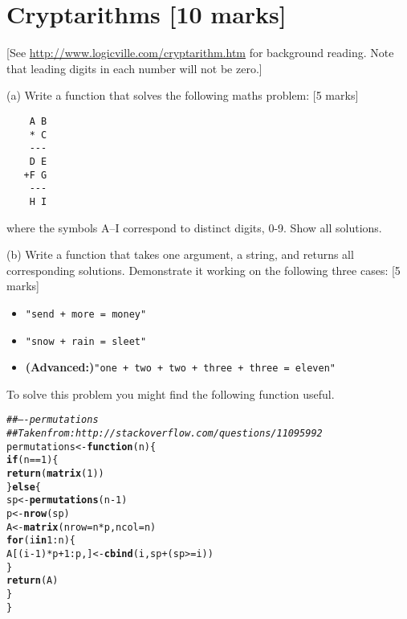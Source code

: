 \documentclass[11pt]{article}\usepackage[]{graphicx}\usepackage[]{color}
\makeatletter
\newcommand{\hlnum}[1]{\textcolor[rgb]{0.686,0.059,0.569}{#1}}%
\newcommand{\hlcom}[1]{\textcolor[rgb]{0.678,0.584,0.686}{\textit{#1}}}%
\newcommand{\hlopt}[1]{\textcolor[rgb]{0,0,0}{#1}}%
\newcommand{\hlstd}[1]{\textcolor[rgb]{0.345,0.345,0.345}{#1}}%
\newcommand{\hlkwa}[1]{\textcolor[rgb]{0.161,0.373,0.58}{\textbf{#1}}}%
\newcommand{\hlkwb}[1]{\textcolor[rgb]{0.69,0.353,0.396}{#1}}%
\newcommand{\hlkwc}[1]{\textcolor[rgb]{0.333,0.667,0.333}{#1}}%
\newcommand{\hlkwd}[1]{\textcolor[rgb]{0.737,0.353,0.396}{\textbf{#1}}}%
\newenvironment{kframe}{%
 \def\at@end@of@kframe{}%
 \ifinner\ifhmode%
  \def\at@end@of@kframe{\end{minipage}}%
  \begin{minipage}{\columnwidth}%
 \fi\fi%
 \def\FrameCommand##1{\hskip\@totalleftmargin \hskip-\fboxsep
 \colorbox{shadecolor}{##1}\hskip-\fboxsep
     \hskip-\linewidth \hskip-\@totalleftmargin \hskip\columnwidth}%
 \MakeFramed {\advance\hsize-\width
   \@totalleftmargin\z@ \linewidth\hsize
   \@setminipage}}%
 {\par\unskip\endMakeFramed%
 \at@end@of@kframe}
\newenvironment{knitrout}{}{} %
\newcommand{\hard}{\textbf{(Advanced:)}\xspace}
\makeatother
\begin{document}
\section{Cryptarithms [10 marks]}

[See \url{http://www.logicville.com/cryptarithm.htm} for background
reading.  Note that leading digits in each number will not be zero.]

(a) Write a function that solves the following maths problem: [5
marks]

\begin{verbatim}
    A B
    * C
    ---
    D E
   +F G
    ---
    H I
\end{verbatim}

where the symbols A--I correspond to distinct digits, 0-9.  Show all
solutions.



(b) Write a function that takes one argument, a string, and returns
all corresponding solutions.  Demonstrate it working on the following
three cases: [5 marks]

\begin{itemize}
\item \texttt{"send + more = money"}
\item \texttt{"snow + rain = sleet"}
\item \hard \texttt{"one + two + two + three + three = eleven"}
\end{itemize}


To solve this problem you might find the following function useful.

\begin{knitrout}
\color{fgcolor}\begin{kframe}
\begin{alltt}
\hlcom{## ---- permutations}
\hlcom{## Taken from: http://stackoverflow.com/questions/11095992}
\hlstd{permutations} \hlkwb{<-} \hlkwa{function}\hlstd{(}\hlkwc{n}\hlstd{)\{}
    \hlkwa{if}\hlstd{(n}\hlopt{==}\hlnum{1}\hlstd{)\{}
        \hlkwd{return}\hlstd{(}\hlkwd{matrix}\hlstd{(}\hlnum{1}\hlstd{))}
    \hlstd{\}} \hlkwa{else} \hlstd{\{}
        \hlstd{sp} \hlkwb{<-} \hlkwd{permutations}\hlstd{(n}\hlopt{-}\hlnum{1}\hlstd{)}
        \hlstd{p} \hlkwb{<-} \hlkwd{nrow}\hlstd{(sp)}
        \hlstd{A} \hlkwb{<-} \hlkwd{matrix}\hlstd{(}\hlkwc{nrow}\hlstd{=n}\hlopt{*}\hlstd{p,}\hlkwc{ncol}\hlstd{=n)}
        \hlkwa{for}\hlstd{(i} \hlkwa{in} \hlnum{1}\hlopt{:}\hlstd{n)\{}
            \hlstd{A[(i}\hlopt{-}\hlnum{1}\hlstd{)}\hlopt{*}\hlstd{p}\hlopt{+}\hlnum{1}\hlopt{:}\hlstd{p,]} \hlkwb{<-} \hlkwd{cbind}\hlstd{(i,sp}\hlopt{+}\hlstd{(sp}\hlopt{>=}\hlstd{i))}
        \hlstd{\}}
        \hlkwd{return}\hlstd{(A)}
    \hlstd{\}}
\hlstd{\}}
\end{alltt}
\end{kframe}
\end{knitrout}
\end{document}

